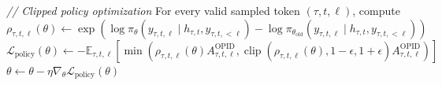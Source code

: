 \documentclass{llmxive}
\begin{document}
\begin{algorithm}[t]
\begin{algorithmic}[1]
    \State \textit{// Clipped policy optimization}
    \State For every valid sampled token $(\tau,t,\ell)$, compute\vspace{-1pt}
    \State $\rho_{\tau,t,\ell}(\theta) \gets
    \exp\!\left(
    \log\pi_{\theta}(y_{\tau,t,\ell}\mid h_{\tau,t},y_{\tau,t,<\ell})
    -\log\pi_{\theta_{\mathrm{old}}}(y_{\tau,t,\ell}\mid h_{\tau,t},y_{\tau,t,<\ell})
    \right)$
    \State $\displaystyle
    \mathcal{L}_{\mathrm{policy}}(\theta) \gets
    -\mathbb{E}_{\tau,t,\ell}\!\left[
    \min\!\left(
    \rho_{\tau,t,\ell}(\theta)A^{\mathrm{OPID}}_{\tau,t,\ell},
    \operatorname{clip}(\rho_{\tau,t,\ell}(\theta),1-\epsilon,1+\epsilon)
    A^{\mathrm{OPID}}_{\tau,t,\ell}
    \right)\right]$
    \State $\theta \gets \theta-\eta\nabla_{\theta}
    \mathcal{L}_{\mathrm{policy}}(\theta)$
\EndFor
\end{algorithmic}
\end{algorithm}
\end{document}
